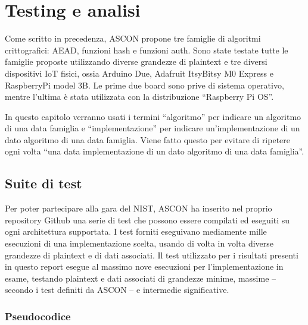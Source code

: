 \chapter{Testing e analisi}\label{ch:test_analysis}

Come scritto in precedenza, ASCON propone tre famiglie di algoritmi crittografici: AEAD, funzioni hash e funzioni auth. Sono state testate tutte le famiglie proposte utilizzando diverse grandezze di plaintext e tre diversi dispositivi IoT fisici, ossia Arduino Due, Adafruit ItsyBitsy M0 Express e RaspberryPi model 3B. Le prime due board sono prive di sistema operativo, mentre l'ultima è stata utilizzata con la distribuzione ``Raspberry Pi OS''.

\noindent In questo capitolo verranno usati i termini ``algoritmo'' per indicare un algoritmo di una data famiglia e ``implementazione'' per indicare un'implementazione di un dato algoritmo di una data famiglia. Viene fatto questo per evitare di ripetere ogni volta ``una data implementazione di un dato algoritmo di una data famiglia''.

\section{Suite di test}

Per poter partecipare alla gara del NIST, ASCON ha inserito nel proprio repository Github una serie di test che possono essere compilati ed eseguiti su ogni architettura supportata. I test forniti eseguivano mediamente mille esecuzioni di una implementazione scelta, usando di volta in volta diverse grandezze di plaintext e di dati associati. Il test utilizzato per i risultati presenti in questo report esegue al massimo nove esecuzioni per l'implementazione in esame, testando plaintext e dati associati di grandezze minime, massime – secondo i test definiti da ASCON – e intermedie significative.

\subsection{Pseudocodice}

